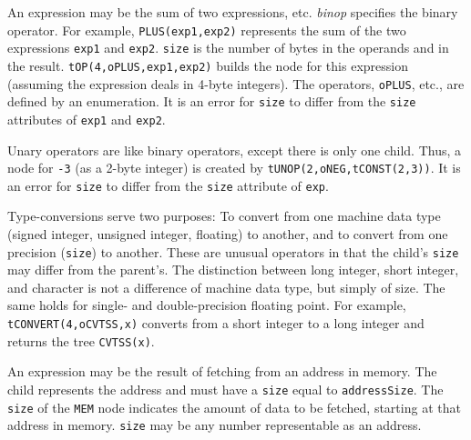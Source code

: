\begin{production}

An expression may be the sum of two expressions, etc.
{\it binop\/} specifies the binary operator.
For example, \verb|PLUS(exp1,exp2)| represents
the sum of the two expressions \verb|exp1| and \verb|exp2|.
\verb|size| is the number of bytes in the operands and in the result.
\verb|tOP(4,oPLUS,exp1,exp2)| builds the node for this expression (assuming
the expression deals in 4-byte integers).
The operators, \verb|oPLUS|, etc., are defined by an enumeration.
It is an error for \verb|size| to differ from the \verb|size|
attributes of \verb|exp1| and \verb|exp2|.


Unary operators are like binary operators, except there is only one child.
Thus, a node for \verb|-3| (as a 2-byte integer) is created by
\verb|tUNOP(2,oNEG,tCONST(2,3))|.
It is an error for \verb|size| to differ from the \verb|size| attribute of \verb|exp|.


Type-conversions serve two purposes:
To convert from one machine data type
(signed integer, unsigned integer, floating) to another, and to convert from
one precision (\verb|size|) to another.
These are unusual operators
in that the child's \verb|size| may differ from the parent's.
The distinction between long integer, short integer, and character
is not a difference of machine data type, but simply of size.
The same holds for single- and double-precision floating point.
For example, \verb|tCONVERT(4,oCVTSS,x)| converts from a short integer
to a long integer and returns the tree \verb|CVTSS(x)|.


An expression may be the result of fetching from an address in memory.
The child represents the address and must have a \verb|size| equal
to \verb|addressSize|.
The \verb|size| of the \verb|MEM| node indicates the amount of data
to be fetched, starting at that address in memory.
\verb|size| may be any number representable as an address.



\end{production}
